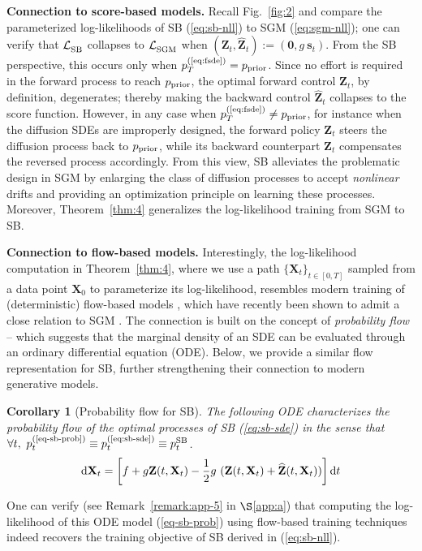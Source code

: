 \documentclass{article}
\def\eqref#1{(\ref{#1})}
\def\rd{{\textnormal{d}}}
\def\rvs{{\mathbf{s}}}
\def\rvX{{\mathbf{X}}}
\def\rvZ{{\mathbf{Z}}}
\def\dt{{ \mathrm{d} t }}
\newcommand{\br}[1]{\left[#1\right]}
\newtheorem{corollary}[theorem]{Corollary}
\begin{document}
\textbf{Connection to score-based models.}
Recall Fig.~\ref{fig:2} and compare the parameterized log-likelihoods of SB \eqref{eq:sb-nll} to SGM \eqref{eq:sgm-nll};
one can verify that ${{\cal L}^{\text{}}_{\text{\normalfont{SB}}}}$ collapses to ${{\cal L}^{\text{}}_{\text{\normalfont{SGM}}}}$ when
$(\rvZ_t, \widehat{\rvZ}_t) := (\mathbf{0}, g~\rvs_t)$.
From the SB perspective, this occurs only when $\pp{T}{\eqref{eq:fsde}} = \prior$.
Since no effort is required in the forward process to reach ${ p_\text{\normalfont{prior}} }$,
the optimal forward control $\rvZ_t$, by definition, degenerates;
thereby making the backward control $\widehat{\rvZ}_t$
collapses to the score function.
However, in any case when $\pp{T}{\eqref{eq:fsde}} \neq \prior$,
{for instance when the diffusion SDEs are improperly designed,}
the forward policy $\rvZ_t$ steers the diffusion process
back to ${ p_\text{\normalfont{prior}} }$,
while its backward counterpart $\widehat{\rvZ}_t$ compensates the reversed process accordingly.
From this view,
SB
alleviates the problematic design in SGM by
enlarging the class of diffusion processes to accept \textit{nonlinear} drifts and
providing an optimization principle on learning these processes.
Moreover, Theorem~\ref{thm:4}
generalizes the log-likelihood training from SGM to SB.


\textbf{Connection to flow-based models.}
Interestingly,
the log-likelihood computation in Theorem~\ref{thm:4},
where we use a path $\{\rvX_t\}_{t\in[0,T]}$ sampled from a data point $\rvX_0$ to parameterize its log-likelihood,
resembles modern training of (deterministic) flow-based models \citep{grathwohl2018ffjord}, which have recently been shown to admit a close relation to SGM \citep{song2020score,gong2021interpreting}.
The connection is built on the concept of \textit{probability flow}
-- which suggests that
the marginal density of an SDE can be evaluated through an
ordinary differential equation (ODE).
Below, we provide a similar flow representation for SB,
further strengthening their connection to modern generative models.
\begin{corollary}[Probability flow for SB] \label{coro:5}
  The following ODE
  characterizes the probability flow of the optimal processes of SB \eqref{eq:sb-sde}
  in the sense that $\forall t,~\pp{t}{\eqref{eq-sb-prob}} \equiv \pp{t}{\eqref{eq:sb-sde}} \equiv \pp{t}{SB}$.
  \begin{align}
    \rd \rvX_t = \br{f + g\rvZ(t, \rvX_t) -\frac{1}{2}g~(\rvZ(t, \rvX_t) + \widehat{\rvZ}(t, \rvX_t))} \dt
    \label{eq-sb-prob}
  \end{align}
\end{corollary}
One can verify (see Remark~\ref{remark:app-5} in $\S$\ref{app:a}) that computing the log-likelihood of this ODE model \eqref{eq-sb-prob}
using flow-based training techniques indeed recovers the training objective of SB derived in \eqref{eq:sb-nll}.
\end{document}
